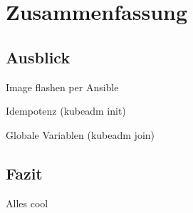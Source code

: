 \chapter{Zusammenfassung}\label{ch:zusammenfassung}

\section{Ausblick}\label{sec:ausblick}

Image flashen per Ansible

Idempotenz (kubeadm init)

Globale Variablen (kubeadm join)

\section{Fazit}\label{sec:fazit}

Alles cool

